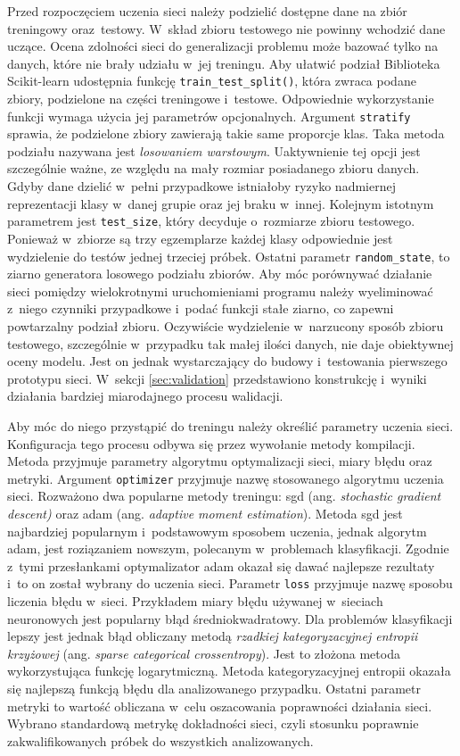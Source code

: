 Przed rozpoczęciem uczenia sieci należy podzielić dostępne dane na zbiór
treningowy oraz~testowy.
W~skład zbioru testowego nie powinny wchodzić dane uczące.
Ocena zdolności sieci do generalizacji problemu może bazować tylko
na danych, które nie brały udziału w~jej treningu.
Aby ułatwić podział Biblioteka Scikit-learn udostępnia funkcję
\texttt{train_test_split()}, która zwraca
podane zbiory, podzielone na części treningowe i~testowe.
Odpowiednie wykorzystanie funkcji wymaga użycia jej parametrów opcjonalnych.
Argument \texttt{stratify} sprawia, że podzielone zbiory
zawierają takie same proporcje klas.
Taka metoda podziału nazywana jest \emph{losowaniem warstowym}.
Uaktywnienie tej opcji jest szczególnie ważne, ze względu na mały rozmiar
posiadanego zbioru danych.
Gdyby dane dzielić w~pełni przypadkowe istniałoby ryzyko nadmiernej
reprezentacji klasy w~danej grupie oraz jej braku w~innej.
Kolejnym istotnym parametrem jest \texttt{test_size}, który
decyduje o~rozmiarze zbioru testowego.
Ponieważ w~zbiorze są trzy egzemplarze każdej klasy odpowiednie jest
wydzielenie do testów jednej trzeciej próbek.
Ostatni parametr \texttt{random_state}, to ziarno generatora
losowego podziału zbiorów.
Aby móc porównywać działanie sieci pomiędzy wielokrotnymi uruchomieniami
programu należy wyeliminować z~niego czynniki przypadkowe i~podać
funkcji stałe ziarno, co zapewni powtarzalny podział zbioru.
Oczywiście wydzielenie w~narzucony sposób zbioru testowego, szczególnie
w~przypadku tak małej ilości danych, nie daje obiektywnej oceny modelu.
Jest on jednak wystarczający do budowy i~testowania pierwszego prototypu
sieci.
W~sekcji \ref{sec:validation} przedstawiono konstrukcję i~wyniki działania
bardziej miarodajnego procesu walidacji.

Aby móc do niego przystąpić do treningu należy określić parametry uczenia
sieci.
Konfiguracja tego procesu odbywa się przez wywołanie metody
kompilacji.
Metoda przyjmuje parametry algorytmu optymalizacji sieci, miary błędu oraz
metryki.
Argument \texttt{optimizer} przyjmuje  nazwę stosowanego
algorytmu uczenia sieci.
Rozważono dwa popularne metody treningu: sgd (ang. \emph{stochastic gradient
descent)} oraz adam (ang. \emph{adaptive moment estimation}).
Metoda sgd jest najbardziej popularnym i~podstawowym sposobem uczenia, jednak
algorytm adam, jest roziązaniem nowszym, polecanym w~problemach klasyfikacji.
Zgodnie z~tymi przesłankami optymalizator adam okazał się dawać najlepsze
rezultaty i~to on został wybrany do uczenia sieci.
Parametr \texttt{loss} przyjmuje nazwę sposobu liczenia błędu
w~sieci.
Przykładem miary błędu używanej w~sieciach neuronowych jest popularny
błąd średniokwadratowy.
Dla problemów klasyfikacji lepszy jest jednak błąd obliczany metodą
\emph{rzadkiej kategoryzacyjnej entropii krzyżowej} (ang. \textit{sparse
categorical crossentropy}).
Jest to złożona metoda wykorzystująca funkcję logarytmiczną.
Metoda kategoryzacyjnej entropii okazała się najlepszą funkcją błędu
dla analizowanego przypadku.
Ostatni parametr metryki to wartość obliczana w~celu oszacowania poprawności
działania sieci.
Wybrano standardową metrykę dokładności sieci, czyli stosunku poprawnie
zakwalifikowanych próbek do wszystkich analizowanych.

